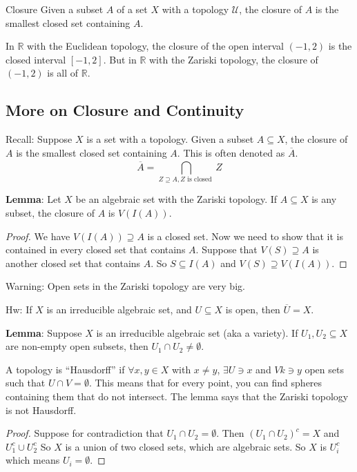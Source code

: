 \documentclass{report}
\begin{document}
\begin{definition}{Closure}
    Given a subset $A$ of a set $X$ with a topology $\mathcal{U}$, the closure of $A$ is the smallest closed set containing $A$.
\end{definition}

\begin{examples}
    \begin{example}
        In $\mathbb{R}$ with the Euclidean topology, the closure of the open interval $(-1, 2)$ is the closed interval $[-1, 2]$. But in $\mathbb{R}$ with the Zariski topology, the closure of $(-1, 2)$ is all of $\mathbb{R}$.
    \end{example}
\end{examples}

\begin{topic}
    \section{More on Closure and Continuity}
\end{topic}

Recall: Suppose $X$ is a set with a topology. Given a subset $A \subseteq  X$, the closure of $A$ is the smallest closed set containing $A$. This is often denoted as $\overline{A}$.
    \begin{equation*}
        \overline{A} = \bigcap_{Z \supseteq A, Z \text{ is closed }}^{} Z
    \end{equation*}

\textbf{Lemma}: Let $X$ be an algebraic set with the Zariski topology. If $A \subseteq X$ is any subset, the closure of $A$ is $V(I(A))$.
    \begin{proof}
        We have $V(I(A)) \supseteq A$ is a closed set. Now we need to show that it is contained in every closed set that contains $A$. Suppose that $V(S) \supseteq A$ is another closed set that contains $A$. So $S \subseteq I(A)$ and $V(S) \supseteq V(I(A))$.
    \end{proof}

Warning: Open sets in the Zariski topology are very big.

Hw: If $X$ is an irreducible algebraic set, and $U \subseteq X$ is open, then $\overline{U} = X$.

\textbf{Lemma}: Suppose $X$ is an irreducible algebraic set (aka a variety). If $U_{1}, U_{2} \subseteq X$ are non-empty open subsets, then $U_{1} \cap U_{2} \neq \emptyset$.

A topology is ``Hausdorff'' if $\forall x, y \in X$ with $x \neq y$, $\exists U \ni x$ and $V k\ni y$ open sets such that $U \cap V = \emptyset$. This means that for every point, you can find spheres containing them that do not intersect. The lemma says that the Zariski topology is not Hausdorff.
    \begin{proof}
        Suppose for contradiction that $U_{1} \cap U_{2} = \emptyset$. Then $(U_{1} \cap U_{2})^{c} = X$ and $U_{1}^{c} \cup U_{2}^{c}$ So $X$ is a union of two closed sets, which are algebraic sets. So $X$ is  $U_{i}^{c}$ which means $U_{i} = \emptyset$.
    \end{proof}
\end{document}

